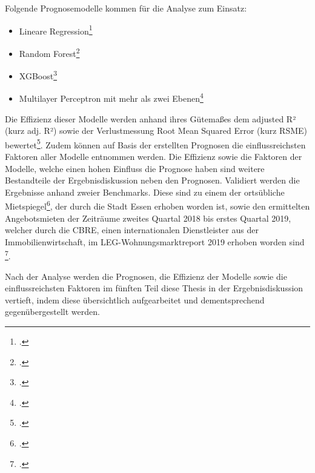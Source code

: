 Folgende Prognosemodelle kommen für die Analyse zum Einsatz:

\begin{itemize}
    \item Lineare Regression\footcite[Vgl. ][]{Verbeek2017}
    \item Random Forest\footcite[Vgl. ][]{Breiman2001}
    \item XGBoost\footcite[Vgl. ][]{Chen2016}
    \item Multilayer Perceptron mit mehr als zwei Ebenen\footcite[Vgl. ][]{Brause1991, Goodfellow2017} 
\end{itemize}

Die Effizienz dieser Modelle werden anhand ihres Gütemaßes dem adjusted R² (kurz adj. R²) 
sowie der Verlustmessung Root Mean Squared Error (kurz RSME) bewertet\footcite[Vgl. ][]{Goodfellow2017,Larose2015}.
Zudem können auf Basis der erstellten Prognosen die einflussreichsten Faktoren aller 
Modelle entnommen werden. Die Effizienz sowie die Faktoren der Modelle, welche einen 
hohen Einfluss die Prognose haben sind weitere Bestandteile der Ergebnisdiskussion neben 
den Prognosen.
\newpage
Validiert werden die Ergebnisse anhand zweier Benchmarks. Diese sind zu einem der 
ortsübliche Mietspiegel\footcite[Vgl. ][]{AmtfurStadterneuerungundBodenmanagement-StadtEssen2020}, 
der durch die Stadt Essen erhoben worden ist, sowie den 
ermittelten Angebotsmieten der Zeiträume zweites Quartal 2018 bis erstes Quartal 2019, 
welcher durch die CBRE, einen internationalen Dienstleister aus der Immobilienwirtschaft, 
im LEG-Wohnungsmarktreport 2019 erhoben worden sind \footcite[Vgl. ][]{LEG2019}.  

Nach der Analyse werden die Prognosen, die Effizienz der Modelle sowie die einflussreichsten 
Faktoren im fünften Teil diese Thesis in der Ergebnisdiskussion vertieft, indem diese 
übersichtlich aufgearbeitet und dementsprechend gegenübergestellt werden. 
